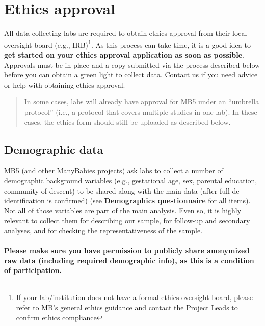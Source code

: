 \documentclass[
]{book}
\begin{document}
\section{Ethics approval}\label{ethics-approval}

All data-collecting labs are required to obtain ethics approval from their local oversight board (e.g., IRB)\footnote{If your lab/institution does not have a formal ethics oversight board, please refer to \href{https://docs.google.com/document/d/e/2PACX-1vR2nv4Wy1soDS4cBBNy9QZOyewvvjP1ka1reBRhAIzcrNi0reJxgHuhGS7f7i2wE0ScQuppek8Al_21/pub}{MB's general ethics guidance} and contact the Project Leads to confirm ethics compliance}. As this process can take time, it is a good idea to \textbf{get started on your ethics approval application as soon as possible}. Approvals must be in place and a copy submitted via the process described below before you can obtain a green light to collect data. \href{mailto:mb5@manybabies.org}{Contact us} if you need advice or help with obtaining ethics approval.

\begin{quote}
In some cases, labs will already have approval for MB5 under an ``umbrella protocol'' (i.e., a protocol that covers multiple studies in one lab). In these cases, the ethics form should still be uploaded as described below.
\end{quote}

\subsection{Demographic data}\label{demographic-data}

MB5 (and other ManyBabies projects) ask labs to collect a number of demographic background variables (e.g., gestational age, sex, parental education, community of descent) to be shared along with the main data (after full de-identification is confirmed) (see \textbf{\href{ADD\%20LINK\%20TO\%20DEMOGRAPHICS\%20QUESTIONNAIRE}{Demographics questionnaire}} for all items). Not all of those variables are part of the main analysis. Even so, it is highly relevant to collect them for describing our sample, for follow-up and secondary analyses, and for checking the representativeness of the sample.

\paragraph*{Please make sure you have permission to publicly share anonymized raw data (including required demographic info), as this is a condition of participation.}\label{please-make-sure-you-have-permission-to-publicly-share-anonymized-raw-data-including-required-demographic-info-as-this-is-a-condition-of-participation.}
\end{document}
